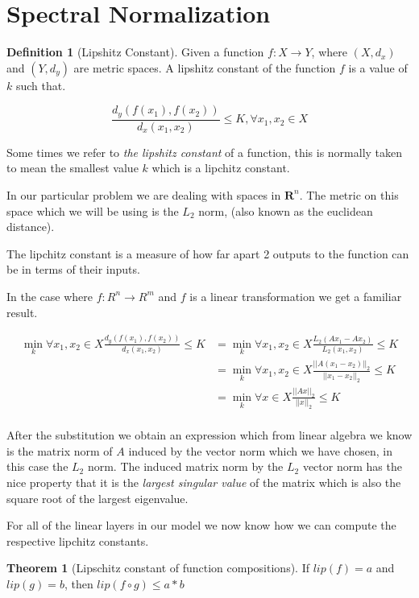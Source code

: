 \documentclass[12pt, a4paper]{report}
\theoremstyle{definition}
\newtheorem{definition}{Definition}[section]
\newtheorem{theorem}{Theorem}[section]
\begin{document}
\section{Spectral Normalization}

\begin{definition}[Lipshitz Constant]
    Given a function $f: X \rightarrow Y$, where $(X, d_x)$ and $(Y, d_y)$ are metric spaces. A lipshitz constant of the function $f$ is a value of $k$ such that.

    $$\frac{d_y(f(x_1), f(x_2))}{d_x(x_1, x_2)} \leq K, \forall x_1, x_2 \in X $$
\end{definition}

Some times we refer to \textit{the lipshitz constant} of a function, this is normally taken to mean the smallest value $k$ which is a lipchitz constant.

In our particular problem we are dealing with spaces in $\mathbf{R}^n$. The metric on this space which we will be using is the $L_2$ norm, (also known as the euclidean distance).

The lipchitz constant is a measure of how far apart 2 outputs to the function can be in terms of their inputs.

In the case where $f: R^n \rightarrow R^m$ and $f$ is a linear transformation we get a familiar result.

\begin{align*}
    \min_k  \forall x_1,x_2 \in X \frac{d_y(f(x_1), f(x_2))}{d_x(x_1, x_2)} \leq K &= \min_k \forall x_1,x_2 \in X \frac{ L_2(Ax_1 - Ax_2)  }{ L_2(x_1, x_2)} \leq K \\
    &=  \min_k \forall x_1,x_2 \in X  \frac{ ||A(x_1 - x_2)||_2  }{ ||x_1- x_2||_2 } \leq K \\
    &=  \min_k \forall x \in X  \frac{ ||Ax||_2  }{ ||x||_2 } \leq K \\
\end{align*}

After the substitution we obtain an expression which from linear algebra we know is the matrix norm of $A$ induced by the vector norm which we have chosen, in this case the $L_2$ norm. The induced matrix norm by the $L_2$ vector norm has the nice property that it is the \textit{largest singular value} of the matrix which is also the square root of the largest eigenvalue.

For all of the linear layers in our model we now know how we can compute the respective lipchitz constants.

\begin{theorem}[Lipschitz constant of function compositions]
    If $lip(f) = a$ and $lip(g) = b$, then $lip(f \circ g) \leq a * b$
\end{theorem}
\end{document}
